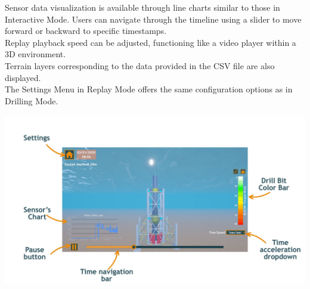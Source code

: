 \documentclass{article}
\begin{document}
Sensor data visualization is available through line charts similar to those in Interactive Mode. Users can navigate through the timeline using a slider to move forward or backward to specific timestamps.\\

Replay playback speed can be adjusted, functioning like a video player within a 3D environment.\\

Terrain layers corresponding to the data provided in the CSV file are also displayed.\\

The Settings Menu in Replay Mode offers the same configuration options as in Drilling Mode.
\begin{center}
    \includegraphics[width=6in]{ReplayMode.jpg}
\end{center}
\end{document}

